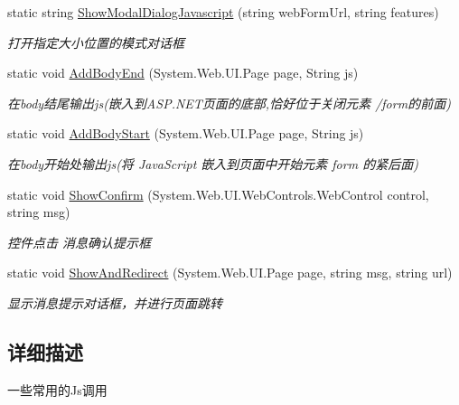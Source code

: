 \begin{DoxyCompactItemize}
static string \hyperlink{class_x_c_l_net_tools_1_1_javascript_1_1_jscript_a9171e2ec7c8e1f0092c0ec0ef2618096}{Show\-Modal\-Dialog\-Javascript} (string web\-Form\-Url, string features)
\begin{DoxyCompactList}\small\item\em 打开指定大小位置的模式对话框 \end{DoxyCompactList}\item 
static void \hyperlink{class_x_c_l_net_tools_1_1_javascript_1_1_jscript_a3dcdf2894a7187508492083b6743abe1}{Add\-Body\-End} (System.\-Web.\-U\-I.\-Page page, String js)
\begin{DoxyCompactList}\small\item\em 在body结尾输出js(嵌入到\-A\-S\-P.\-N\-E\-T页面的底部,恰好位于关闭元素 /form的前面) \end{DoxyCompactList}\item 
static void \hyperlink{class_x_c_l_net_tools_1_1_javascript_1_1_jscript_ab8e14181b9b1e9f12462ef20f49d69ee}{Add\-Body\-Start} (System.\-Web.\-U\-I.\-Page page, String js)
\begin{DoxyCompactList}\small\item\em 在body开始处输出js(将 Java\-Script 嵌入到页面中开始元素 form 的紧后面) \end{DoxyCompactList}\item 
static void \hyperlink{class_x_c_l_net_tools_1_1_javascript_1_1_jscript_a94e45aa47def3164202b40ff0405f922}{Show\-Confirm} (System.\-Web.\-U\-I.\-Web\-Controls.\-Web\-Control control, string msg)
\begin{DoxyCompactList}\small\item\em 控件点击 消息确认提示框 \end{DoxyCompactList}\item 
static void \hyperlink{class_x_c_l_net_tools_1_1_javascript_1_1_jscript_ade747fd49c7e14dae3652e014a6255d9}{Show\-And\-Redirect} (System.\-Web.\-U\-I.\-Page page, string msg, string url)
\begin{DoxyCompactList}\small\item\em 显示消息提示对话框，并进行页面跳转 \end{DoxyCompactList}\end{DoxyCompactItemize}


\subsection{详细描述}
一些常用的\-Js调用 



